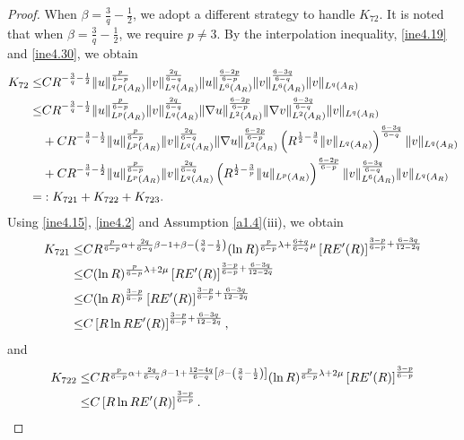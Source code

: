 \documentclass[10pt,a4paper]{amsart}
\begin{document}
\begin{proof}
When $\beta=\frac{3}{q}-\frac{1}{2}$, we adopt a different strategy to handle $K_{72}$. It is noted that when $\beta=\frac{3}{q}-\frac{1}{2}$, we require $p\neq3$.
By the interpolation inequality, \eqref{ine4.19} and \eqref{ine4.30}, we obtain
\begin{align}\label{ine4.46}
	K_{72} \leq& CR^{-\frac{3}{q}-\frac{1}{2}}\|u\|_{L^p(A_R)}^{\frac{p}{6-p}}\|v\|_{L^q(A_R)}^{\frac{2q}{6-q}} \|u\|_{L^6(A_R)}^{\frac{6-2p}{6-p}}\|v\|_{L^6(A_R)}^{\frac{6-3q}{6-q}} \|v\|_{L^q(A_R)}\notag\\
	\leq &CR^{-\frac{3}{q}-\frac{1}{2}}\|u\|_{L^p(A_R)}^{\frac{p}{6-p}}\|v\|_{L^q(A_R)}^{\frac{2q}{6-q}}\|\nabla u\|_{L^2(A_R)}^{\frac{6-2p}{6-p}}\|\nabla v\|_{L^2(A_R)}^{\frac{6-3q}{6-q}}\|v\|_{L^q(A_R)}\notag\\
&+CR^{-\frac{3}{q}-\frac{1}{2}}\|u\|_{L^p(A_R)}^{\frac{p}{6-p}}\|v\|_{L^q(A_R)}^{\frac{2q}{6-q}}\|\nabla u\|_{L^2(A_R)}^{\frac{6-2p}{6-p}}\left(R^{\frac{1}{2}-\frac{3}{q}} \|v\|_{L^q(A_R)}\right)^{\frac{6-3q}{6-q}}\|v\|_{L^q(A_R)}\\
&+CR^{-\frac{3}{q}-\frac{1}{2}}\|u\|_{L^p(A_R)}^{\frac{p}{6-p}}\|v\|_{L^q(A_R)}^{\frac{2q}{6-q}}\left(R^{\frac{1}{2}-\frac{3}{p}} \|u\|_{L^p(A_R)}\right)^{\frac{6-2p}{6-p}} \|v\|_{L^6(A_R)}^{\frac{6-3q}{6-q}}\|v\|_{L^q(A_R)}\notag\\
=&:K_{721} + K_{722} + K_{723}.\notag
\end{align}
Using \eqref{ine4.15}, \eqref{ine4.2} and Assumption \ref{a1.4}(iii), we obtain
\begin{align}\label{ine4.47}
K_{721}\leq&CR^{\frac{p}{6-p}\alpha+\frac{2q}{6-q}\beta-1+\beta-\left(\frac{3}{q}-\frac{1}{2}\right)}(\ln R)^{\frac{p}{6-p}\lambda+\frac{6+q}{6-q}\mu} \left[RE'(R)\right]^{\frac{3-p}{6-p}+\frac{6-3q}{12-2q}}\notag\\
\leq&C(\ln R)^{\frac{p}{6-p}\lambda+2\mu} \left[RE'(R)\right]^{\frac{3-p}{6-p}+\frac{6-3q}{12-2q}}\notag\\
\leq&C(\ln R)^\frac{3-p}{6-p} \left[RE'(R)\right]^{\frac{3-p}{6-p}+\frac{6-3q}{12-2q}}\\
\leq&C\left[R\ln RE'(R)\right]^{\frac{3-p}{6-p}+\frac{6-3q}{12-2q}},\notag
\end{align}
and
\begin{align}\label{ine4.48}
K_{722}\leq&CR^{\frac{p}{6-p}\alpha+\frac{2q}{6-q}\beta-1+\frac{12-4q}{6-q}\left[\beta-\left(\frac{3}{q}-\frac{1}{2}\right)\right]}(\ln R)^{\frac{p}{6-p}\lambda+2\mu} \left[RE'(R)\right]^{\frac{3-p}{6-p}}\notag\\
\leq&C\left[R\ln RE'(R)\right]^{\frac{3-p}{6-p}}.

\end{align}
\end{proof}
\end{document}
